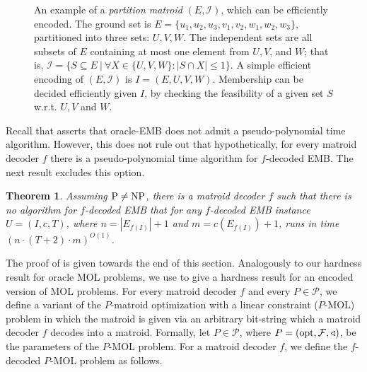 \documentclass[11pt,letter]{article}
\newcommand{\opt}{\textnormal{opt}}
\newcommand{\cI}{{\mathcal{I}}}
\newcommand{\cF}{{\mathcal{F}}}
\newcommand{\cP}{{\mathcal{P}}}
\newtheorem{theorem}[lemma]{Theorem}
\begin{document}
\begin{figure}
		\caption{\label{fig:M1} An example of a {\em partition matroid} $(E,\cI)$, which  can be efficiently encoded. The ground set is $E = \{u_1,u_2,u_3,v_1,v_2,w_1,w_2,w_3\}$, partitioned into three sets: $U,V,W$. The independent sets are all subsets of $E$ containing at most one element from $U,V$, and $W$; that is, $\cI = \{S \subseteq E~|~\forall X \in \{U,V,W\}: |S \cap X| \leq 1\}$. A simple efficient encoding of $(E,\cI)$ is $I = (E,U,V,W)$. %
			Membership can be decided efficiently given $I$, by checking the feasibility
			of a given set $S$ w.r.t. $U,V$ and $W$.} 
	\end{figure}

Recall that  asserts that oracle-EMB does not admit a pseudo-polynomial time algorithm. However, %
 this does not rule out that hypothetically, for every matroid decoder $f$ there is a pseudo-polynomial time algorithm  %
 for $f$-decoded EMB. The next result excludes this option. %

\begin{theorem}
	\label{thm:embA}
		Assuming $\textnormal{P} \neq \textnormal{NP}$, there is a matroid decoder $f$ such that there is no algorithm  for $f$-\textnormal{decoded EMB} that for any  $f$-\textnormal{decoded EMB} instance $U =(I,c,T)$, where $n = \left|E_{f(I)}\right|+1$ and $m = c\left(E_{f(I)}\right) +1$, runs in time $ (n \cdot(T+2) \cdot m)^{O(1)}$. 
\end{theorem}

	
	
The proof of  is given towards the end of this section. Analogously to our hardness result for oracle MOL problems, we use  to give a hardness result for an encoded version of MOL problems. For every matroid decoder $f$ and every $P \in \cP$, we define a variant of the $P$-{\sc matroid optimization with a linear constraint ($P$-MOL)} problem %
	in which the matroid is given via an arbitrary bit-string which a matroid decoder $f$ decodes into a matroid. 
	Formally, let $P \in \cP$, where $P = (\opt,\cF,\triangleleft)$, be the parameters of the $P$-MOL problem. For a matroid decoder $f$, we define the $f$-decoded $P$-MOL problem as follows.  
	
\end{document}
